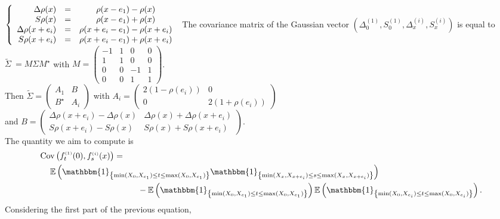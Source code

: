 \documentclass[12pt]{article}
\renewcommand{\tilde}{\widetilde}
\theoremstyle{Theorem}
\begin{document}
{\small
$\left\{\begin{array}{rlc}
\Delta \rho(x) & = & \rho(x-e_1)-\rho(x) \\
S\rho(x) & = & \rho(x-e_1)+\rho(x)\\
\Delta \rho(x+e_i) & = & \rho(x+e_i-e_1)-\rho(x+e_i) \\
S\rho(x+e_i) & = & \rho(x+e_i-e_1)+\rho(x+e_i)\\
\end{array}\right.\\
$
}
The covariance matrix of the Gaussian vector $\left(\Delta^{\scriptscriptstyle (1)}_{\scriptscriptstyle 0}, S^{\scriptscriptstyle (1)}_{\scriptscriptstyle 0}, \Delta^{\scriptscriptstyle (i)}_{\scriptscriptstyle x}, S^{\scriptscriptstyle (i)}_{\scriptscriptstyle x}\right)$ is equal to ${\tilde{\Sigma}~= M\Sigma M^{\star}}$ with {\small $M = \begin{pmatrix}
-1 & 1 & 0 &  0 \\
1 & 1 & 0 &  0 \\
0& 0 & -1 &  1 \\
0 & 0 & 1 & 1
\end{pmatrix}$}. \\
Then $\tilde{\Sigma} = \begin{pmatrix} A_{1} & B \\ B^{\star} & A_{i} \end{pmatrix}$
with 
$A_{i} = \begin{pmatrix} 2(1-\rho(e_i)) & 0 \\ 0 & 2(1+\rho(e_i))\end{pmatrix}$ \\
and {\small $B = \begin{pmatrix} \Delta \rho(x+e_i) - \Delta \rho(x)&    \Delta \rho(x) + \Delta \rho(x+e_i) \\ 
 S\rho(x+e_i)- S\rho(x) &  S\rho(x) + S\rho(x+e_i) 
 \end{pmatrix}$}. \\
The quantity we aim to compute is 
{\small
\begin{align}
\label{covconf}
\text{Cov}\left(f_{t}^{\scriptscriptstyle (1)}(0), f_{s}^{ \scriptscriptstyle (i)}(x)\right) & = \nonumber \\
& \hspace{-2.7cm} \mathbb{E}\left(\mathbbm{1}_{\left\{\min(X_{\scriptscriptstyle 0}, X_{e_1}) \leq t \leq \max(X_{\scriptscriptstyle 0}, X_{e_1})\right\}}\mathbbm{1}_{\left\{\min(X_{\scriptscriptstyle x}, X_{x+e_i}) \leq s \leq \max(X_{\scriptscriptstyle x}, X_{x+e_i}) \right\}}\right) \nonumber\\
& \hspace{1cm} - \mathbb{E}\left(\mathbbm{1}_{\left\{\min(X_{\scriptscriptstyle 0}, X_{e_1}) \leq t \leq \max(X_{\scriptscriptstyle 0}, X_{e_1})\right\}}\right)\mathbb{E}\left(\mathbbm{1}_{\left\{\min(X_{\scriptscriptstyle 0}, X_{e_i}) \leq t \leq \max(X_{\scriptscriptstyle 0}, X_{e_i})\right\}}\right).
\end{align}}Considering the first part of the previous equation, 
\end{document}
